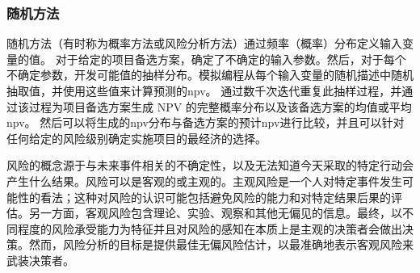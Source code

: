 \subsubsection{随机方法}
随机方法（有时称为概率方法或风险分析方法）通过频率（概率）分布定义输入变量的值。 对于给定的项目备选方案，确定了不确定的输入参数。然后，对于每个不确定参数，开发可能值的抽样分布。模拟编程从每个输入变量的随机描述中随机抽取值，并使用这些值来计算预测的\acrlong*{npv}。 通过数千次迭代重复此抽样过程，并通过该过程为项目备选方案生成 NPV 的完整概率分布以及该备选方案的均值或平均\acrlong*{npv}。 然后可以将生成的\acrlong*{npv}分布与备选方案的预计\acrlong*{npv}进行比较，并且可以针对任何给定的风险级别确定实施项目的最经济的选择。

风险的概念源于与未来事件相关的不确定性，以及无法知道今天采取的特定行动会产生什么结果。风险可以是客观的或主观的。主观风险是一个人对特定事件发生可能性的看法；这种对风险的认识可能包括避免风险的能力和对特定结果后果的评估。另一方面，客观风险包含理论、实验、观察和其他无偏见的信息。最终，以不同程度的风险承受能力为特征并且对风险的感知在本质上是主观的决策者会做出决策。然而，风险分析的目标是提供最佳无偏风险估计，以最准确地表示客观风险来武装决策者。

